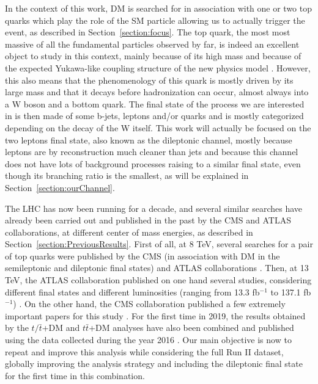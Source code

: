 \documentclass[a4paper, 10pt, openright]{report}
\begin{document}
In the context of this work, \ac{DM} is searched for in association with one or two top quarks which play the role of the \ac{SM} particle allowing us to actually trigger the event, as described in Section~\ref{section:focus}. The top quark, the most most massive of all the fundamental particles observed by far, is indeed an excellent object to study in this context, mainly because of its high mass and because of the expected Yukawa-like coupling structure of the new physics model \cite{MFVYukawa}. However, this also means that the phenomenology of this quark is mostly driven by its large mass and that it decays before hadronization can occur, almost always into a W boson and a bottom quark. The final state of the process we are interested in is then made of some b-jets, leptons and/or quarks and is mostly categorized depending on the decay of the W itself. This work will actually be focused on the two leptons final state, also known as the dileptonic channel, mostly because leptons are by reconstruction much cleaner than jets and because this channel does not have lots of background processes raising to a similar final state, even though its branching ratio is the smallest, as will be explained in Section~\ref{section:ourChannel}.

The \ac{LHC} has now been running for a decade, and several similar searches have already been carried out and published in the past by the \ac{CMS} and \ac{ATLAS} collaborations, at different center of mass energies, as described in Section~\ref{section:PreviousResults}. First of all, at 8 TeV, several searches for a pair of top quarks were published by the \ac{CMS} (in association with \ac{DM} in the semileptonic \cite{PreviousDoubleTopSingleLep8CMS} and dileptonic \cite{PreviousDoubleTopDiLep8CMS} final states) and \ac{ATLAS} collaborations \cite{PreviousDoubleTopAllLep8ATLAS}. Then, at 13 TeV, the \ac{ATLAS} collaboration published on one hand several studies, considering different final states and different luminosities (ranging from 13.3 fb$^{-1}$ to 137.1 fb$^{-1}$) \cite{PreviousDoubleTopNoLep13ATLAS, PreviousDoubleTopOneLep13ATLAS, PreviousDoubleTopDiLep13ATLAS, PreviousDoubleTopBottomAllLep13ATLAS,  ATLASICHEP2020}. On the other hand, the \ac{CMS} collaboration published a few extremely important papers for this study \cite{PreviousDoubleTopBottomAllLep13CMS, PreviousDoubleTopAllLep13CMS}. For the first time in 2019, the results obtained by the $t/\bar t$+DM and $t \bar t$+DM analyses have also been combined and published using the data collected during the year 2016 \cite{PreviousSingleDoubleTopAllLep13CMS}. Our main objective is now to repeat and improve this analysis while considering the full Run II dataset, globally improving the analysis strategy and including the dileptonic final state for the first time in this combination.
\end{document}
